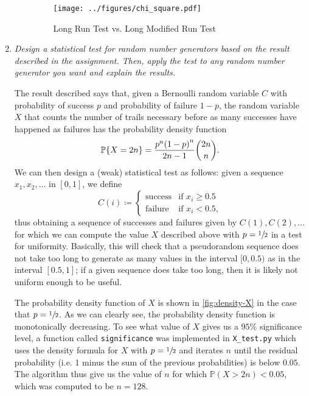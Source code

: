 \documentclass{article}
\renewcommand{\geq}{\geqslant}
\newcommand{\defn}{\coloneqq}
\DeclarePairedDelimiter \set{\lbrace}{\rbrace}
\DeclarePairedDelimiter \parens{(}{)}
\begin{document}
\begin{enumerate}
\begin{enumerate}
                \begin{figure}[H]
                    \centering
                    \caption{Long Run Test vs. Long Modified Run Test}
                    \texttt{[image: ../figures/chi\_square.pdf]}
                    \label{fig:chi}
                \end{figure}
        \end{enumerate}
    \item
        {\it Design a statistical test for random number generators based on the result described in the assignment.
        Then, apply the test to any random number generator you want and explain the results.}

        The result described says that, given a Bernoulli random variable $C$ with probability of success $p$ and probability of failure $1-p$,
        the random variable $X$ that counts the number of trails necessary before as many successes have happened as failures has the probability density function
        \begin{equation*}
            \mathbb{P}\set*{X = 2n} = \frac{p^n\parens*{1-p}^n}{2n-1}{2n \choose n}.
        \end{equation*}
        We can then design a (weak) statistical test as follows: given a sequence $x_1, x_2, \dots$ in $[0, 1]$, we define
        \begin{equation*}
            C(i) \defn
            \begin{cases}
                \text{success} &\text{if } x_i \geq 0.5\\
                \text{failure} &\text{if } x_i < 0.5,
            \end{cases}
        \end{equation*}
        thus obtaining a sequence of successes and failures given by $C(1), C(2), \dots$ for which we can compute the value $X$ described above with $p = \sfrac{1}{2}$
        in a test for uniformity.
        Basically, this will check that a pseudorandom sequence does not take too long to generate as many values in the interval $[0, 0.5)$ as in the interval $[0.5, 1]$;
        if a given sequence does take too long, then it is likely not uniform enough to be useful.

        The probability density function of $X$ is shown in \autoref{fig:density-X} in the case that $p = \sfrac{1}{2}$.
        As we can clearly see, the probability density function is monotonically decreasing.
        To see what value of $X$ gives us a $95\%$ significance level, a function called \texttt{significance} was implemented in \texttt{X\_test.py}
        which uses the density formula for $X$ with $p = \sfrac{1}{2}$ and iterates $n$ until the residual probability
        (i.e. 1 minus the sum of the previous probabilities) is below $0.05$.
        The algorithm thus give us the value of $n$ for which $\mathbb{P}(X > 2n) < 0.05$, which was computed to be $n = 128$.


\end{enumerate}
\end{document}
